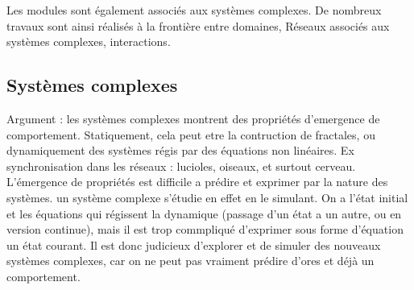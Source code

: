 Les modules sont également associés aux systèmes complexes. De nombreux travaux sont ainsi réalisés à la frontière entre domaines, 
Réseaux associés aux systèmes complexes, interactions.


\subsection{Systèmes complexes}

Argument : les systèmes complexes montrent des propriétés d’emergence de comportement. Statiquement, cela peut etre la contruction de fractales, ou dynamiquement des systèmes régis par des équations non linéaires. Ex synchronisation dans les réseaux : lucioles, oiseaux, et surtout cerveau. L’émergence de propriétés est difficile a prédire et exprimer par la nature des systèmes. un système complexe s’étudie en effet en le simulant. On a l’état initial et les équations qui régissent la dynamique (passage d’un état a un autre, ou en version continue), mais il est trop commpliqué d’exprimer sous forme d’équation un état courant. 
Il est donc judicieux d’explorer et de simuler des nouveaux systèmes complexes, car on ne peut pas vraiment prédire d’ores et déjà un comportement. 



%
%


